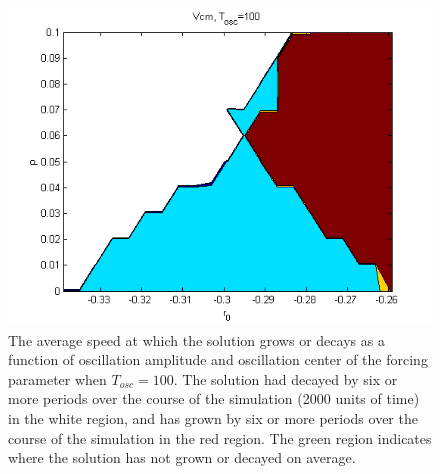 \documentclass[pre,preprint,superscriptaddress]{revtex4-1}
\begin{document}
\begin{figure}[!htb]\center
\includegraphics[width=120mm]{Vcm100.png}
\caption{The average speed at which the solution grows or decays as a function of oscillation amplitude and oscillation center of the forcing parameter when $T_{osc}=100$.  The solution had decayed by six or more periods over the course of the simulation (2000 units of time) in the white region, and has grown by six or more periods over the course of the simulation  in the red region.  The green region indicates where the solution has not grown or decayed on average.}
    \label{fig:Vcm100}
\end{figure}
\end{document}

